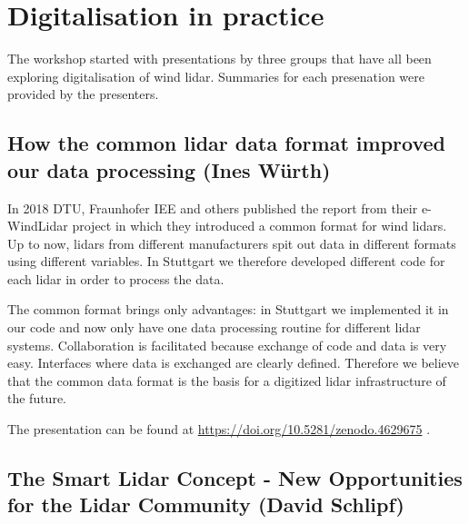 \section{Digitalisation in practice}

The workshop started with presentations by three groups that have all been exploring digitalisation of wind lidar. Summaries for each presenation were provided by the presenters.

\subsection{How the common lidar data format improved our data processing (Ines Würth)}

\begin{altquote}
    In 2018 DTU, Fraunhofer IEE and others published the report from their e-WindLidar project \citep{nikola_vasiljevic_2018_2478051} in which they introduced a common format for wind lidars. Up to now, lidars from different manufacturers spit out data in different formats using different variables. In Stuttgart we therefore developed different code for each lidar in order to process the data.

    The common format brings only advantages: in Stuttgart we implemented it in our code and now only have one data processing routine for different lidar systems. Collaboration is facilitated because exchange of code and data is very easy. Interfaces where data is exchanged are clearly defined. Therefore we believe that the common data format is the basis for a digitized lidar infrastructure of the future.
\end{altquote}

The presentation can be found at \href{https://doi.org/10.5281/zenodo.4629675}{https://doi.org/10.5281/zenodo.4629675} \cite{wurth_ines_2021_4629675}.

\subsection{The Smart Lidar Concept - New Opportunities for the Lidar Community (David Schlipf)}

